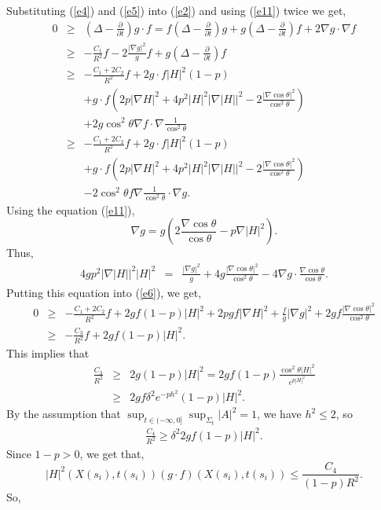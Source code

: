 Substituting (\ref{e4}) and (\ref{e5}) into (\ref{e2}) and using
(\ref{e11}) twice we get, \allowdisplaybreaks
\begin{eqnarray}\label{e6}
0 &\geq& (\Delta-\frac{\partial}{\partial t}) g\cdot
f=f(\Delta-\frac{\partial}{\partial
t})g+g(\Delta-\frac{\partial}{\partial t})f+2\nabla g\cdot\nabla f
\nonumber
\\ &\geq& -\frac{C_1}{R^2}f-2\frac{|\nabla g|^2}{g} f
+g(\Delta-\frac{\partial}{\partial t})f \nonumber\\
&\geq&-\frac{C_1+2C_2}{R^2}f+ 2g\cdot f|H|^2(1-p)\nonumber\\
&&+g\cdot f(2p|\nabla H|^2+4p^2|H|^2|\nabla
|H||^2-2\frac{|\nabla\cos\theta|^2}{\cos^2\theta})\nonumber\\
&&+2 g\cos^2\theta\nabla f\cdot\nabla\frac{1}{\cos^2\theta} \nonumber\\
&\geq&-\frac{C_1+2C_2}{R^2}f+ 2g\cdot f|H|^2(1-p)\nonumber\\
&&+g\cdot f(2p|\nabla H|^2+4p^2|H|^2|\nabla
|H||^2-2\frac{|\nabla\cos\theta|^2}{\cos^2\theta})\nonumber\\&&-2\cos^2\theta
f\nabla\frac{1}{\cos^2\theta}\cdot\nabla g.
\end{eqnarray} Using the equation (\ref{e11}),
$$\nabla g=g(2\frac{\nabla \cos\theta}{\cos\theta}-p\nabla |H|^2).
$$ Thus,
\begin{eqnarray*}
4gp^2|\nabla |H||^2 |H|^2&=&\frac{|\nabla
g|^2}{g}+4g\frac{|\nabla\cos\theta|^2}{\cos^2\theta}-4\nabla
g\cdot\frac{\nabla\cos\theta}{\cos\theta}.
\end{eqnarray*} Putting this equation into (\ref{e6}),
we get,
\begin{eqnarray*}
0 &\geq& -\frac{C_1+2C_2}{R^2}f+2gf(1-p)|H|^2+2pgf |\nabla
H|^2+\frac{f}{g}|\nabla
g|^2+2gf\frac{|\nabla\cos\theta|^2}{\cos^2\theta} \\ &\geq&
-\frac{C_3}{R^2}f+2gf(1-p)|H|^2.
\end{eqnarray*} This implies that
\begin{eqnarray*}
\frac{C_3}{R^2} &\geq& 2g(1-p)|H|^2 =2gf(1-p)\frac{\cos^2\theta
|H|^2}{e^{p|H|^2}} \\ &\geq& 2gf\delta^2 e^{-ph^2}(1-p)|H|^2.
\end{eqnarray*} By the assumption that $\sup_{t\in (-\infty,
0]}\sup_{\Sigma_t}|A|^2=1$, we have $h^2\leq 2$, so
\begin{eqnarray*}
\frac{C_4}{R^2}\geq \delta^2 2gf(1-p)|H|^2.
\end{eqnarray*}
Since $1-p>0$, we get that,
$$ |H|^2(X(s_i), t(s_i))(g\cdot f)(X(s_i), t(s_i))\leq
\frac{C_4}{(1-p)R^2}.
$$ So,

